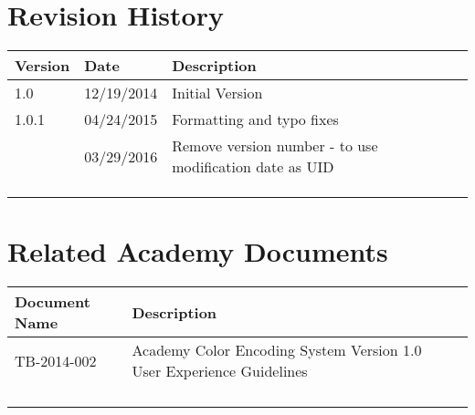 \prelimsectionformat	%
\chapter{Revision History}

\begin{tabularx}{\linewidth}{|l|l|X|}
    \hline
    Version & Date       & Description \\ \hline
    1.0     & 12/19/2014 & Initial Version
    \\ \hline
    1.0.1   & 04/24/2015 & Formatting and typo fixes \\ \hline
            & 03/29/2016 & Remove version number - to use modification date as UID \\ \hline
    &   &   \\ \hline
    &   &   \\ \hline
    &   &   \\ \hline
\end{tabularx}

\vspace{0.25in} %
\chapter{Related Academy Documents} %
\begin{tabularx}{\linewidth}{|l|l|l|X|}
    \hline
    Document Name & Description \\ \hline
    TB-2014-002 & Academy Color Encoding System Version 1.0 User Experience Guidelines \\ \hline
    & \\ \hline
    & \\ \hline
    & \\ \hline
    & \\ \hline
\end{tabularx}